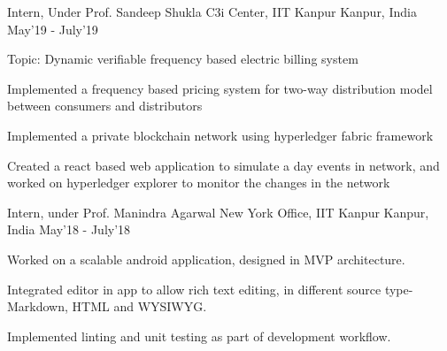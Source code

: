 \begin{cventries}
    \cventry
  {Intern, Under Prof. Sandeep Shukla}
  {C3i Center, IIT Kanpur}
  {Kanpur, India}
  {May'19 - July'19}
  {
    \begin{cvitems}
    	  \item {Topic: Dynamic verifiable frequency based electric billing system}
          \item {Implemented a frequency based pricing system for two-way distribution model between consumers and distributors}
          \item {Implemented a private blockchain network using hyperledger fabric framework}
          \item {Created a react based web application to simulate a day events in network, and worked on hyperledger explorer to monitor the changes in the network}
    \end{cvitems}
  }
  

  \cventry
  {Intern, under Prof. Manindra Agarwal}
  {New York Office, IIT Kanpur}
  {Kanpur, India}
  {May'18 - July'18}
  {
    \begin{cvitems}
          \item {Worked on a scalable android application, designed in MVP architecture.}
          \item {Integrated editor in app to allow rich text editing, in different source type- Markdown, HTML and WYSIWYG.}
          \item{Implemented linting and unit testing as part of development workflow.}
    \end{cvitems}
  }

\end{cventries}